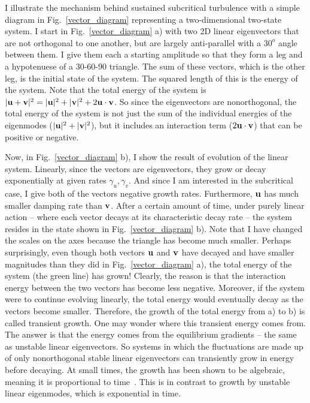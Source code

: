 I illustrate the mechanism behind sustained subcritical turbulence with a simple diagram in Fig.~\ref{vector_diagram} representing a two-dimensional two-state system. 
I start in Fig.~\ref{vector_diagram} a) with two 2D linear eigenvectors that are not orthogonal to one another, but are largely anti-parallel with a $30^o$ angle between them. 
I give them each a starting amplitude so that they form a leg and a hypotenuese of a 30-60-90 triangle. The sum of these vectors, which is the other leg, is the initial state of the system.
The squared length of this is the energy of the system. Note that the total energy of the system is $|{\bf u} + {\bf v}|^2 = |{\bf u}|^2 + |{\bf v}|^2 + 2 {\bf u} \cdot {\bf v}$. So since the
eigenvectors are nonorthogonal, the total energy of the system is not just the sum of the individual energies of the eigenmodes ($|{\bf u}|^2 + |{\bf v}|^2$), but it includes an interaction
term ($2 {\bf u} \cdot {\bf v}$) that can be positive or negative.

Now, in Fig.~\ref{vector_diagram} b), I show the result of evolution of the linear system. Linearly, since the vectors are eigenvectors, 
they grow or decay exponentially at given rates $\gamma_u, \gamma_v$. And since I am
interested in the subcritical case, I give both of the vectors negative growth rates. Furthermore, ${\bf u}$ has much smaller damping rate than ${\bf v}$. After a certain amount of time, under
purely linear action -- where each vector decays at its characteristic decay rate -- the system resides in the state shown in Fig.~\ref{vector_diagram} b). Note that I have changed the scales on
the axes because the triangle has become much smaller. Perhaps surprisingly, even though both vectors ${\bf u}$ and ${\bf v}$ have decayed and have smaller magnitudes than they did in 
Fig.~\ref{vector_diagram} a), the total energy of the system (the green line) has grown! Clearly, the reason is that the interaction energy between the two vectors has become less negative.
Moreover, if the system were to continue evolving linearly, the total energy would eventually decay as the vectors become smaller. Therefore, the growth of the total energy from a) to b)
is called transient growth. One may wonder where this transient energy comes from. The answer is that the energy comes from the equilibrium gradients -- the same as unstable linear eigenvectors.
So systems in which the fluctuations are made up of only nonorthogonal stable linear eigenvectors can transiently grow in energy before decaying. At small times, the growth has been shown to be
algebraic, meaning it is proportional to time~\cite{waleffe1995}. This is in contrast to growth by unstable linear eigenmodes, which is exponential in time.

